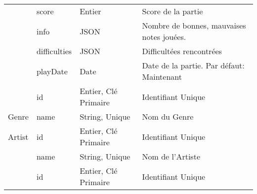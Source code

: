 \begin{longtable}[c]{@{}|p{}|p{}|p{}|p{}|@{}}
														& score                                                & Entier                                                                                   & Score de la partie                                                                       \\* \cline{2-4} 
														& info                                                 & JSON                                                                                     & Nombre de bonnes, mauvaises notes jouées.                                                \\* \cline{2-4} 
														& difficulties                                         & JSON                                                                                     & Difficultées rencontrées                                                                 \\* \cline{2-4} 
								                        & playDate                                             & Date                                                                                     & Date de la partie. Par défaut: Maintenant                                                \\* \hline
														& id                                                   & Entier, Clé Primaire                                                                     & Identifiant Unique                                                                       \\* \cline{2-4} 
	\multirow{-2}{*}{Genre}                             & name                                                 & String, Unique                                                                           & Nom du Genre                                                                             \\* \hline
	\multirow{-1}{*}{Artist}							& id                                                   & Entier, Clé Primaire                                                                     & Identifiant Unique                                                                       \\* \cline{2-4} 
								                            & name                                                 & String, Unique                                                                           & Nom de l’Artiste                                                                         \\* \hline
														& id                                                   & Entier, Clé Primaire                                                                     & Identifiant Unique                                                                       \\* \cline{2-4} 

\end{longtable}
